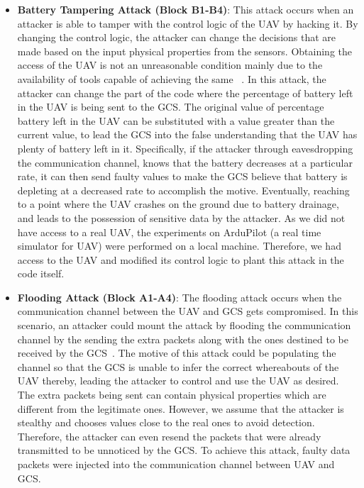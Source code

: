 \begin{itemize}
\item {\bf Battery Tampering Attack (Block B1-B4)}: This attack occurs when an attacker is able to tamper with the control logic of the \ac{UAV} by hacking it. By changing the control logic, the attacker can change the decisions that are made based on the input physical properties from the sensors. Obtaining the access of the \ac{UAV} is not an unreasonable condition mainly due to the availability of tools capable of achieving the same ~\cite{pleban2014hacking, rodday2016exploring}.
In this attack, the attacker can change the part of the code where the percentage of battery left in the \ac{UAV} is being sent to the \ac{GCS}. The original value of percentage battery left in the \ac{UAV} can be substituted with a value greater than the current value, to lead the \ac{GCS} into the false understanding that the \ac{UAV} has plenty of battery left in it. Specifically, if the attacker through eavesdropping the communication channel, knows that the battery decreases at a particular rate, it can then send faulty values to make the \ac{GCS} believe that battery is depleting at a decreased rate to accomplish the motive. Eventually, reaching to a point where the \ac{UAV} crashes on the ground due to battery drainage, and leads to the possession of sensitive data by the attacker. As we did not have access to a real \ac{UAV}, the experiments on ArduPilot (a real time simulator for \ac{UAV}) were performed on a local machine. Therefore, we had access to the \ac{UAV} and modified its control logic to plant this attack in the code itself.

\item {\bf Flooding Attack (Block A1-A4)}: The flooding attack occurs when the communication channel between the \ac{UAV} and \ac{GCS} gets compromised. In this scenario, an attacker could mount the attack by flooding the communication channel by the sending the extra packets along with the ones destined to be received by the \ac{GCS}~\cite{pleban2014hacking}. The motive of this attack could be populating the channel so that the \ac{GCS} is unable to infer the correct whereabouts of the \ac{UAV} thereby, leading the attacker to control and use the \ac{UAV} as desired. The extra packets being sent can contain physical properties which are different from the legitimate ones. However, we assume that the attacker is stealthy and chooses values close to the real ones to avoid detection. Therefore, the attacker can even resend the packets that were already transmitted to be unnoticed by the \ac{GCS}. To achieve this attack, faulty data packets were injected into the communication channel between \ac{UAV} and \ac{GCS}.


\end{itemize}

